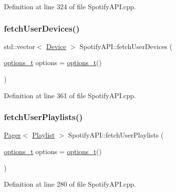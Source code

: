 Definition at line 324 of file Spotify\+A\+P\+I.\+cpp.

\mbox{\label{class_spotify_a_p_i_abee264c9d301954c6628d1a0c3a18342}} 
\subsubsection{\texorpdfstring{fetch\+User\+Devices()}{fetchUserDevices()}}
{\footnotesize\ttfamily std\+::vector$<$ \mbox{\hyperlink{class_device}{Device}} $>$ Spotify\+A\+P\+I\+::fetch\+User\+Devices (\begin{DoxyParamCaption}\item[{\mbox{\hyperlink{_spotify_a_p_i_8h_a0ff5cac1a4007bb330b7d9939650c283}{options\+\_\+t}}}]{options = {\ttfamily \mbox{\hyperlink{_spotify_a_p_i_8h_a0ff5cac1a4007bb330b7d9939650c283}{options\+\_\+t}}()} }\end{DoxyParamCaption})}



Definition at line 361 of file Spotify\+A\+P\+I.\+cpp.

\mbox{\label{class_spotify_a_p_i_a79f8d10db209ef00b17c0e7e0df750e8}} 
\subsubsection{\texorpdfstring{fetch\+User\+Playlists()}{fetchUserPlaylists()}\hspace{0.1cm}{\footnotesize\ttfamily [1/2]}}
{\footnotesize\ttfamily \mbox{\hyperlink{class_pager}{Pager}}$<$ \mbox{\hyperlink{class_playlist}{Playlist}} $>$ Spotify\+A\+P\+I\+::fetch\+User\+Playlists (\begin{DoxyParamCaption}\item[{\mbox{\hyperlink{_spotify_a_p_i_8h_a0ff5cac1a4007bb330b7d9939650c283}{options\+\_\+t}}}]{options = {\ttfamily \mbox{\hyperlink{_spotify_a_p_i_8h_a0ff5cac1a4007bb330b7d9939650c283}{options\+\_\+t}}()} }\end{DoxyParamCaption})}



Definition at line 280 of file Spotify\+A\+P\+I.\+cpp.

